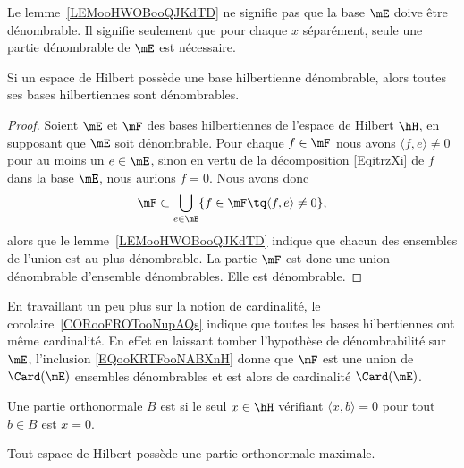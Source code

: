 \begin{remark}
	Le lemme~\ref{LEMooHWOBooQJKdTD} ne signifie pas que la base \( \mE\) doive être dénombrable. Il signifie seulement que pour chaque \( x\) séparément, seule une partie dénombrable de \( \mE\) est nécessaire.
\end{remark}

\begin{corollary}       \label{CORooFROTooNupAQs}
	Si un espace de Hilbert possède une base hilbertienne dénombrable, alors toutes ses bases hilbertiennes sont dénombrables.
\end{corollary}

\begin{proof}
	Soient \( \mE\) et \( \mF\) des bases hilbertiennes de l'espace de Hilbert \( \hH\), en supposant que \( \mE\) soit dénombrable. Pour chaque \( f\in \mF\) nous avons \( \langle f, e\rangle \neq 0\) pour au moins un \( e\in\mE\), sinon en vertu de la décomposition \eqref{EqitrzXi} de \( f\) dans la base \( \mE\), nous aurions \( f=0\). Nous avons donc
	\begin{equation}    \label{EQooKRTFooNABXnH}
		\mF\subset\bigcup_{e\in \mE}\{ f\in\mF\tq \langle f, e\rangle \neq 0 \},
	\end{equation}
	alors que le lemme~\ref{LEMooHWOBooQJKdTD} indique que chacun des ensembles de l'union est au plus dénombrable. La partie \( \mF\) est donc une union dénombrable d'ensemble dénombrables. Elle est dénombrable.
\end{proof}

\begin{remark}
	En travaillant un peu plus sur la notion de cardinalité, le corolaire~\ref{CORooFROTooNupAQs} indique que toutes les bases hilbertiennes ont même cardinalité. En effet en laissant tomber l'hypothèse de dénombrabilité sur \( \mE\), l'inclusion \eqref{EQooKRTFooNABXnH} donne que \( \mF\) est une union de \( \Card(\mE)\) ensembles dénombrables et est alors de cardinalité \( \Card(\mE)\).
\end{remark}

\begin{definition}      \label{DEFooRFATooDRKWoJ}
	Une partie orthonormale \( B\) est  si le seul \( x\in \hH\) vérifiant \( \langle x, b\rangle =0\) pour tout \( b\in B\) est \( x=0\).
\end{definition}

\begin{lemma}\label{LEMooXIECooCAQeJN}
	Tout espace de Hilbert possède une partie orthonormale maximale.
\end{lemma}

